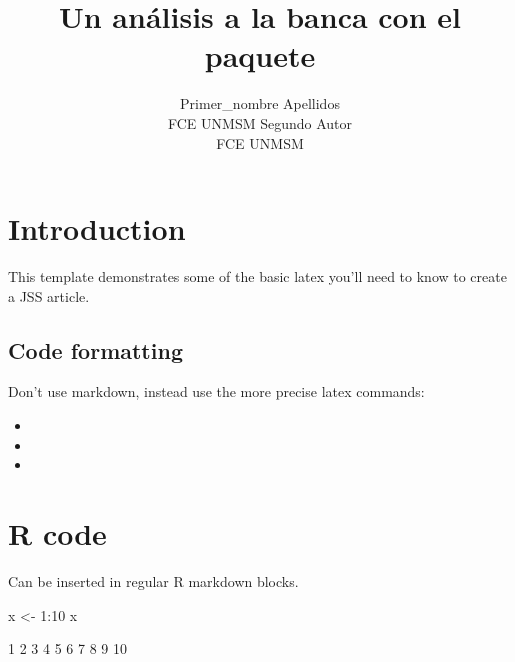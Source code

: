 \documentclass[article]{jss}
\author{
Primer\_nombre Apellidos\\FCE UNMSM \And Segundo Autor\\FCE UNMSM
}
\title{Un análisis a la banca con el paquete \pkg{BCRP}}
\begin{document}
\section{Introduction}\label{introduction}

This template demonstrates some of the basic latex you'll need to know
to create a JSS article.

\subsection{Code formatting}\label{code-formatting}

Don't use markdown, instead use the more precise latex commands:

\begin{itemize}
\itemsep1pt\parskip0pt
\item
\item
\item
\end{itemize}

\section{R code}\label{r-code}

Can be inserted in regular R markdown blocks.

\begin{CodeChunk}
\begin{CodeInput}
x <- 1:10
x
\end{CodeInput}
\begin{CodeOutput}
 [1]  1  2  3  4  5  6  7  8  9 10
\end{CodeOutput}
\end{CodeChunk}
\end{document}
